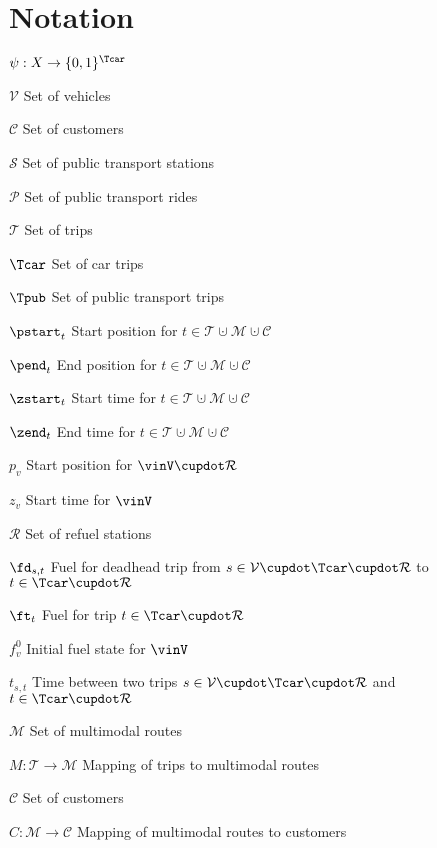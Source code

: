 \chapter*{Notation}

\begin{labeling}{$\psi:X\to\{0,1\}^{\Tcar}$}
	\item[$\mathcal{V}$]{Set of vehicles}
	\item[$\mathcal{C}$]{Set of customers}
	\item[$\mathcal{S}$]{Set of public transport stations}
	\item[$\mathcal{P}$]{Set of public transport rides}
	\item[$\mathcal{T}$]{Set of trips}
	\item[$\Tcar$]{Set of car trips}
	\item[$\Tpub$]{Set of public transport trips}
	\item[$\pstart_t$]{Start position for $t\in\mathcal{T}\cupdot\mathcal{M}\cupdot\mathcal{C}$}
	\item[$\pend_t$]{End position for $t\in\mathcal{T}\cupdot\mathcal{M}\cupdot\mathcal{C}$}
	\item[$\zstart_t$]{Start time for $t\in\mathcal{T}\cupdot\mathcal{M}\cupdot\mathcal{C}$}
	\item[$\zend_t$]{End time for $t\in\mathcal{T}\cupdot\mathcal{M}\cupdot\mathcal{C}$}
	\item[$p_v$]{Start position for $\vinV\cupdot\mathcal{R}$}
	\item[$z_v$]{Start time for $\vinV$}
	\item[$\mathcal{R}$]{Set of refuel stations}
	\item[$\fd_{s,t}$]{Fuel for deadhead trip from $s\in\mathcal{V}\cupdot\Tcar\cupdot\mathcal{R}$ to $t\in\Tcar\cupdot\mathcal{R}$}
	\item[$\ft_t$]{Fuel for trip $t\in\Tcar\cupdot\mathcal{R}$}
	\item[$f^0_v$]{Initial fuel state for $\vinV$}
	\item[$t_{s,t}$]{Time between two trips $s\in\mathcal{V}\cupdot\Tcar\cupdot\mathcal{R}$ and $t\in\Tcar\cupdot\mathcal{R}$}
	\item[$\mathcal{M}$]{Set of multimodal routes}
	\item[$M:\mathcal{T}\to\mathcal{M}$]{Mapping of trips to multimodal routes}
	\item[$\mathcal{C}$]{Set of customers}
	\item[$C:\mathcal{M}\to\mathcal{C}$]{Mapping of multimodal routes to customers}

\end{labeling}
